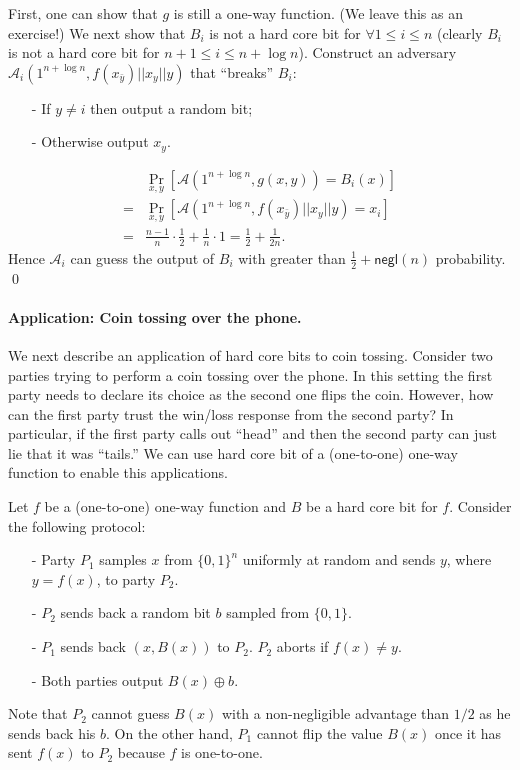 First, one can show that $g$ is still a one-way function. (We leave this as an exercise!)
We next show that $B_i$ is not a hard core bit for $\forall 1 \leq i \leq n$ (clearly $B_i$ is not a hard core bit for $n+1 \leq i \leq n+\log n$).
Construct an adversary $\mathcal{A}_i(1^{n+\log n}, f(x_{\bar y}) || x_y || y)$ that ``breaks'' $B_i$:
\begin{itemize}
\item[-] If $y \not= i$ then output a random bit;
\item[-] Otherwise output $x_y$.
\end{itemize}
\begin{align*}
& \Pr_{x, y}[\mathcal{A}(1^{n+\log n}, g(x,y)) = B_i(x)]\\
=& \Pr_{x, y}[\mathcal{A}(1^{n+\log n}, f(x_{\bar y}) || x_y || y) = x_i]\\
=& \frac{n-1}{n} \cdot \frac{1}{2} + \frac{1}{n} \cdot 1 = \frac{1}{2} + \frac{1}{2n}.
\end{align*}
Hence $\mathcal{A}_i$ can guess the output of $B_i$ with greater than $\frac{1}{2} + \mathsf{negl}(n)$ probability.
\qed



\paragraph{Application: Coin tossing over the phone.} We next describe an application of hard core bits to coin tossing.
Consider two parties trying to perform a coin tossing over the phone. In this setting the first party needs to declare its choice as the second one flips the coin. However, how can the first party trust the win/loss response from the second party?  In particular, if the first party calls out ``head'' and then the second party can just lie that it was ``tails.'' We can use hard core bit of a (one-to-one) one-way function to  enable this applications.

Let $f$ be a (one-to-one) one-way function and $B$ be a hard core bit for $f$. Consider the following protocol:
\begin{itemize}
\item[-] Party $P_1$ samples $x$ from $\{0,1\}^n$ uniformly at random and sends $y$, where $y = f(x)$, to party $P_2$.
\item[-] $P_2$ sends back a random bit $b$ sampled from $\{0,1\}$.
\item[-] $P_1$ sends back $(x, B(x))$ to $P_2$. $P_2$ aborts if $f(x) \neq y$.
\item[-]  Both parties output $B(x)\oplus b$.
\end{itemize}
Note that $P_2$ cannot guess $B(x)$ with a non-negligible advantage than $1/2$ as he sends back his $b$.
On the other hand, $P_1$ cannot flip the value $B(x)$ once it has sent $f(x)$ to $P_2$ because $f$ is one-to-one.


